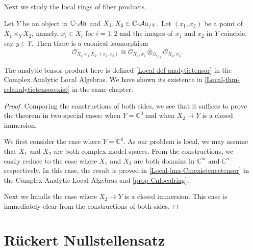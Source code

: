 Next we study the local rings of fiber products.
\begin{theorem}
    Let $Y$ be an object in $\mathbb{C}\text{-}\mathcal{A}\mathrm{n}$ and $X_1,X_2\in \mathbb{C}\text{-}\mathcal{A}\mathrm{n}_{/Y}$. Let $(x_1,x_2)$ be a point of $X_1\times_Y X_2$, namely, $x_i\in X_i$ for $i=1,2$ and the images of $x_1$ and $x_2$ in $Y$ coincide, say $y\in Y$. 
    Then there is a caonical isomorphism
    \[
        \mathcal{O}_{X_1\times_Y X_2, (x_1,x_2)}\cong \mathcal{O}_{X_1,x_1}\overline{\otimes}_{\mathcal{O}_{Y,y}}  \mathcal{O}_{X_2,x_2}.     
    \]
\end{theorem}
The analytic tensor product here is defined \cref{Local-def-analytictensor} in the Complex Analytic Local Algebras. We have shown its existence in \cref{Local-thm-relanalytictensorexist} in the same chapter.

\begin{proof}
    Comparing the constructions of both sides, we see that it suffices to prove the theorem in two special cases: when $Y=\mathbb{C}^0$ and when $X_2\rightarrow Y$ is a closed immersion. 

    We first consider the case where $Y=\mathbb{C}^0$. As our problem is local, we may assume that $X_1$ and $X_2$ are both complex model spaces. From the constructions, we easily reduce to the case where $X_1$ and $X_2$ are both domains in $\mathbb{C}^m$ and $\mathbb{C}^n$ respectively. In this case, the result is proved in \cref{Local-lma-Cmexistencetensor} in the Complex Analytic Local Algebras and \cref{prop-Cnlocalring}.
    
    Next we handle the case where $X_2\rightarrow Y$ is a closed immersion. This case is immediately clear from the constructions of both sides.
\end{proof}




\iffalse
\section{Rückert Nullstellensatz}





